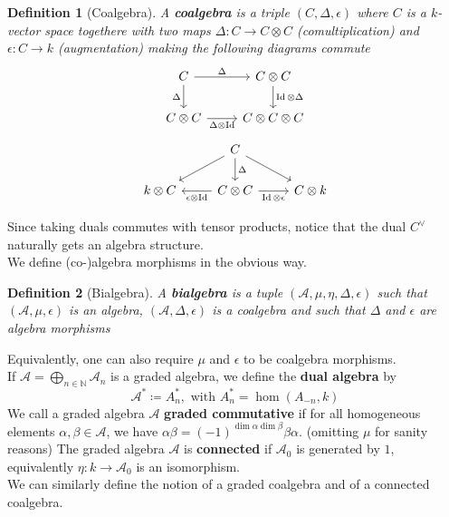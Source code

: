 \documentclass[11pt, a4paper]{article}
\DeclareMathOperator*{\id}{Id}
\newtheorem{defn}{Definition}
\theoremstyle{plain}
\begin{document}
\begin{defn}[Coalgebra]
	A \textbf{coalgebra} is a triple $( C,\Delta,\epsilon) $ where $C$ is a $k$-vector space togethere with two maps $\Delta\colon C \to C \otimes C$ (comultiplication) and $\epsilon\colon C \to k$ (augmentation) making the following diagrams commute
\[\begin{tikzcd}
	C & {C\otimes C} \\
	{C\otimes C} & {C\otimes C \otimes C}
	\arrow["\Delta", from=1-1, to=1-2]
	\arrow["{\id \otimes \Delta}", from=1-2, to=2-2]
	\arrow["{\Delta \otimes \id}"', from=2-1, to=2-2]
	\arrow["\Delta"', from=1-1, to=2-1]
\end{tikzcd}\]
\[\begin{tikzcd}
	& C \\
	{k\otimes C} & {C\otimes C} & {C\otimes k}
	\arrow["\Delta", from=1-2, to=2-2]
	\arrow[from=1-2, to=2-1]
	\arrow[from=1-2, to=2-3]
	\arrow["{\id \otimes \epsilon}"', from=2-2, to=2-3]
	\arrow["{\epsilon \otimes \id}", from=2-2, to=2-1]
\end{tikzcd}\]
\end{defn}
Since taking duals commutes with tensor products, notice that the dual  $C^{\vee}$ naturally gets an algebra structure.\\
We define (co-)algebra morphisms in the obvious way.
\begin{defn}[Bialgebra]
	A \textbf{bialgebra} is a tuple $( \mathcal{A}, \mu, \eta, \Delta, \epsilon) $ such that $( \mathcal{A}, \mu,\epsilon)$ is an algebra, $( \mathcal{A}, \Delta, \epsilon) $ is a coalgebra and such that $\Delta$ and $\epsilon$ are algebra morphisms
\end{defn}
Equivalently, one can also require $\mu$ and $\epsilon$ to be coalgebra morphisms.\\
If $\mathcal{A}= \bigoplus_{n \in \mathbb{N}}  \mathcal{A}_n$ is a graded algebra, we define the \textbf{dual algebra} by
\[ 
\mathcal{A}^{\ast} \coloneq A_n^{\ast}, \text{ with } A_n^{\ast}=\hom( A_{-n} , k) 
\]
We call a graded algebra $\mathcal{A}$ \textbf{graded commutative} if for all homogeneous elements $\alpha,\beta \in \mathcal{A}$, we have $\alpha \beta= (-1)^{\dim \alpha\dim\beta}\beta \alpha$. (omitting $\mu$ for sanity reasons)
The graded algebra $\mathcal{A}$ is \textbf{connected} if $\mathcal{A}_0$ is generated by $1$, equivalently $\eta\colon k \to \mathcal{A}_0$ is an isomorphism.\\
We can similarly define the notion of a  graded coalgebra and of a connected coalgebra.
\end{document}
